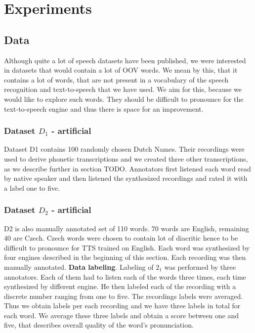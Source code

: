 \chapter{Experiments}
\section{Data}
\label{data-desc}
Although quite a lot of speech datasets have been published, we were interested in datasets that would contain a lot of OOV words.
We mean by this, that it contains a lot of words, that are not present in a vocabulary of the speech recognition and text-to-speech that we have used.
We aim for this, because we would like to explore such words.
They should be difficult to pronounce for the text-to-speech engine and thus there is space for an improvement.
\subsection{Dataset \textbf{$D_1$} - artificial}
Dataset D1 contains 100 randomly chosen Dutch Names.
Their recordings were used to derive phonetic transcriptions and we created three other transcriptions, as we describe further in section TODO.
Annotators first listened each word read by native speaker and then listened the synthesized recordings and rated it with a label one to five.
\subsection{Dataset \textbf{$D_2$} - artificial}
D2 is also manually annotated set of 110 words.
70 words are English, remaining 40 are Czech.
Czech words were chosen to contain lot of diacritic hence to be difficult to pronounce for TTS trained on English.
Each word was synthesized by four engines described in the beginning of this section.
Each recording was then manually annotated.
\textbf{Data labeling}. Labeling of $2_1$  was performed by three annotators. Each of them had to listen each of the words three times, each time synthesized by different engine. He then labeled each of the recording with a discrete number ranging from one to five. The recordings labels were averaged. Thus we obtain labels per each recording and we have three labels in total for each word. We average these three labels and obtain a score between one and five, that describes overall quality of the word's pronunciation.
